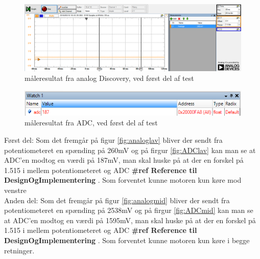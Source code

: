 \begin{figure}[H]
	\centering
	\includegraphics[width=\textwidth]{test/images/ModultestADC/260mVanalog}
	\caption{måleresultat fra analog Discovery, ved først del af test}
	\label{figure:analoglav}
\end{figure}
\begin{figure}[H]
	\centering
	\includegraphics[width=\textwidth]{test/images/ModultestADC/nedDebug}
	\caption{måleresultat fra ADC, ved først del af test}
	\label{figure: ADClav}
\end{figure}
Først del: Som det fremgår på figur \ref{fig:analoglav} bliver der sendt fra potentiometeret  en spænding på 260mV og på firgur \ref{fig:ADClav} kan man se at ADC’en modtog en værdi på 187mV, man skal huske på at der en forskel på 1.515 i mellem potentiometeret og ADC \textbf{\#ref Reference til DesignOgImplementering }. 
Som forventet kunne motoren kun køre mod venstre\\

Anden del: Som det fremgår på figur \ref{fig:analogmid}  bliver der sendt fra potentiometeret en spænding på 2538mV og på firgur \ref{fig:ADCmid}  kan man se at ADC’en modtog en værdi på 1595mV, man skal huske på at der en forskel på 1.515 i mellem potentiometeret og ADC \textbf{\#ref Reference til DesignOgImplementering }. 
Som forventet kunne motoren kun køre i begge retninger.\\


